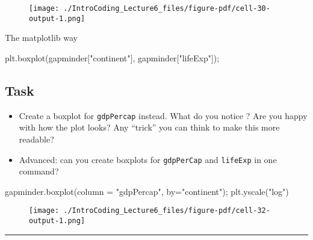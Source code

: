 \documentclass[
  letterpaper,
  DIV=11,
  numbers=noendperiod]{scrreprt}
\newenvironment{Shaded}{\begin{snugshade}}{\end{snugshade}}
\newcommand{\NormalTok}[1]{\textcolor[rgb]{0.00,0.23,0.31}{#1}}
\newcommand{\OperatorTok}[1]{\textcolor[rgb]{0.37,0.37,0.37}{#1}}
\newcommand{\StringTok}[1]{\textcolor[rgb]{0.13,0.47,0.30}{#1}}
\begin{document}
\begin{figure}[H]

{\centering \texttt{[image: ./IntroCoding\_Lecture6\_files/figure-pdf/cell-30-output-1.png]}

}

\end{figure}

The matplotlib way

\begin{Shaded}
\begin{Highlighting}[]
\NormalTok{plt.boxplot(gapminder[}\StringTok{"continent"}\NormalTok{], gapminder[}\StringTok{"lifeExp"}\NormalTok{])}\OperatorTok{;}
\end{Highlighting}
\end{Shaded}

\hypertarget{task}{%
\subsection{Task}\label{task}}

\begin{itemize}
\item
  Create a boxplot for \texttt{gdpPercap} instead. What do you notice ?
  Are you happy with how the plot looks? Any ``trick'' you can think to
  make this more readable?
\item
  Advanced: can you create boxplots for \texttt{gdpPerCap} and
  \texttt{lifeExp} in one command?
\end{itemize}

\begin{Shaded}
\begin{Highlighting}[]
\NormalTok{gapminder.boxplot(column }\OperatorTok{=} \StringTok{"gdpPercap"}\NormalTok{, by}\OperatorTok{=}\StringTok{"continent"}\NormalTok{)}\OperatorTok{;}
\NormalTok{plt.yscale(}\StringTok{"log"}\NormalTok{)}
\end{Highlighting}
\end{Shaded}

\begin{figure}[H]

{\centering \texttt{[image: ./IntroCoding\_Lecture6\_files/figure-pdf/cell-32-output-1.png]}

}

\end{figure}

\begin{center}\rule{0.5\linewidth}{0.5pt}\end{center}
\end{document}
